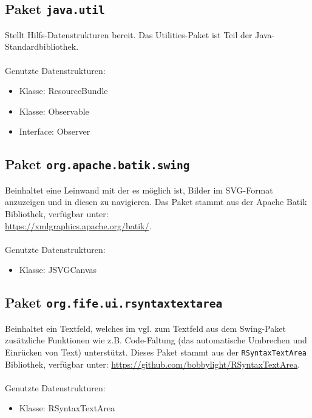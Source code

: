 \documentclass[parskip=full,11pt,twoside]{scrartcl}
\begin{document}
\subsection{Paket \texttt{java.util}}
Stellt Hilfs-Datenstrukturen bereit. Das Utilities-Paket ist Teil der Java-Standardbibliothek.\\\\Genutzte Datenstrukturen:

\begin{multicols}{2}
\begin{itemize}
	\item Klasse: ResourceBundle
	\item Klasse: Observable
	\item Interface: Observer
\end{itemize}
\end{multicols}

\subsection{Paket \texttt{org.apache.batik.swing}}

Beinhaltet eine Leinwand mit der es möglich ist, Bilder im SVG-Format anzuzeigen und in diesen zu navigieren. Das Paket stammt aus der Apache Batik Bibliothek, verfügbar unter:\\ \url{https://xmlgraphics.apache.org/batik/}.\\\\Genutzte Datenstrukturen:
\begin{itemize}
	\item Klasse: JSVGCanvas
\end{itemize}

\subsection{Paket \texttt{org.fife.ui.rsyntaxtextarea}}

Beinhaltet ein Textfeld, welches im vgl. zum Textfeld aus dem Swing-Paket zusätzliche Funktionen wie z.B. Code-Faltung (das automatische Umbrechen und Einrücken von Text) unterstützt. Dieses Paket stammt aus der \texttt{RSyntaxTextArea} Bibliothek, verfügbar unter:  \url{https://github.com/bobbylight/RSyntaxTextArea}.\\\\Genutzte Datenstrukturen:
\begin{itemize}
	\item Klasse: RSyntaxTextArea
\end{itemize}
\end{document}
